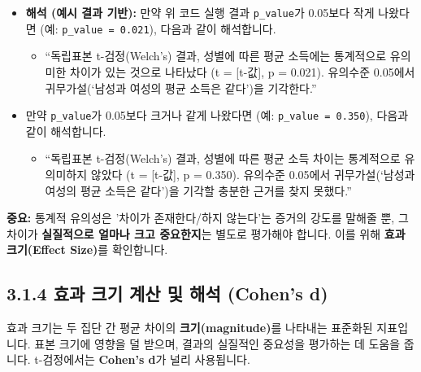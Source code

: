 \documentclass[
  letterpaper,
]{book}
\providecommand{\tightlist}{%
  \setlength{\itemsep}{0pt}\setlength{\parskip}{0pt}}
\begin{document}
\begin{itemize}
\tightlist
\item
  \textbf{해석 (예시 결과 기반):} 만약 위 코드 실행 결과
  \texttt{p\_value}가 0.05보다 작게 나왔다면 (예:
  \texttt{p\_value\ =\ 0.021}), 다음과 같이 해석합니다.

  \begin{itemize}
  \tightlist
  \item
    ``독립표본 t-검정(Welch's) 결과, 성별에 따른 평균 소득에는
    통계적으로 유의미한 차이가 있는 것으로 나타났다 (t = {[}t-값{]}, p =
    0.021). 유의수준 0.05에서 귀무가설(`남성과 여성의 평균 소득은
    같다')을 기각한다.''
  \end{itemize}
\item
  만약 \texttt{p\_value}가 0.05보다 크거나 같게 나왔다면 (예:
  \texttt{p\_value\ =\ 0.350}), 다음과 같이 해석합니다.

  \begin{itemize}
  \tightlist
  \item
    ``독립표본 t-검정(Welch's) 결과, 성별에 따른 평균 소득 차이는
    통계적으로 유의미하지 않았다 (t = {[}t-값{]}, p = 0.350). 유의수준
    0.05에서 귀무가설(`남성과 여성의 평균 소득은 같다')을 기각할 충분한
    근거를 찾지 못했다.''
  \end{itemize}
\end{itemize}

\textbf{중요:} 통계적 유의성은 '차이가 존재한다/하지 않는다'는 증거의
강도를 말해줄 뿐, 그 차이가 \textbf{실질적으로 얼마나 크고 중요한지}는
별도로 평가해야 합니다. 이를 위해 \textbf{효과 크기(Effect Size)}를
확인합니다.

\subsection{3.1.4 효과 크기 계산 및 해석 (Cohen's
d)}\label{uxd6a8uxacfc-uxd06cuxae30-uxacc4uxc0b0-uxbc0f-uxd574uxc11d-cohens-d}

효과 크기는 두 집단 간 평균 차이의 \textbf{크기(magnitude)}를 나타내는
표준화된 지표입니다. 표본 크기에 영향을 덜 받으며, 결과의 실질적인
중요성을 평가하는 데 도움을 줍니다. t-검정에서는 \textbf{Cohen's d}가
널리 사용됩니다.
\end{document}
